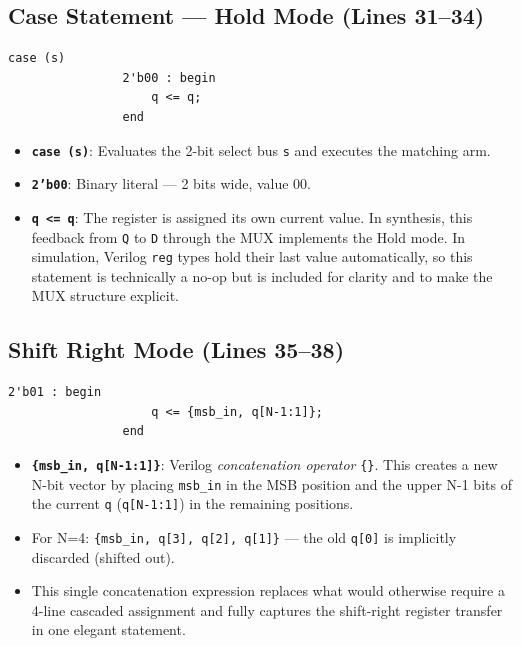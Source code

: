 \documentclass[12pt,a4paper]{report}
\begin{document}
\subsection{Case Statement — Hold Mode (Lines 31--34)}

\begin{lstlisting}[firstnumber=31, caption={Case statement: Hold mode}]
            case (s)
                2'b00 : begin
                    q <= q;
                end
\end{lstlisting}

\begin{itemize}
    \item \textbf{\texttt{case (s)}}: Evaluates the 2-bit select bus \texttt{s} and executes the matching arm.
    \item \textbf{\texttt{2'b00}}: Binary literal — 2 bits wide, value 00.
    \item \textbf{\texttt{q <= q}}: The register is assigned its own current value. In synthesis, this feedback from \texttt{Q} to \texttt{D} through the MUX implements the Hold mode. In simulation, Verilog \texttt{reg} types hold their last value automatically, so this statement is technically a no-op but is included for clarity and to make the MUX structure explicit.
\end{itemize}

\subsection{Shift Right Mode (Lines 35--38)}

\begin{lstlisting}[firstnumber=35, caption={Case statement: Shift Right mode}]
                2'b01 : begin
                    q <= {msb_in, q[N-1:1]};
                end
\end{lstlisting}

\begin{itemize}
    \item \textbf{\texttt{\{msb\_in, q[N-1:1]\}}}: Verilog \textit{concatenation operator} \texttt{\{\}}. This creates a new N-bit vector by placing \texttt{msb\_in} in the MSB position and the upper N-1 bits of the current \texttt{q} (\texttt{q[N-1:1]}) in the remaining positions.
    \item For N=4: \texttt{\{msb\_in, q[3], q[2], q[1]\}} — the old \texttt{q[0]} is implicitly discarded (shifted out).
    \item This single concatenation expression replaces what would otherwise require a 4-line cascaded assignment and fully captures the shift-right register transfer in one elegant statement.
\end{itemize}
\end{document}
